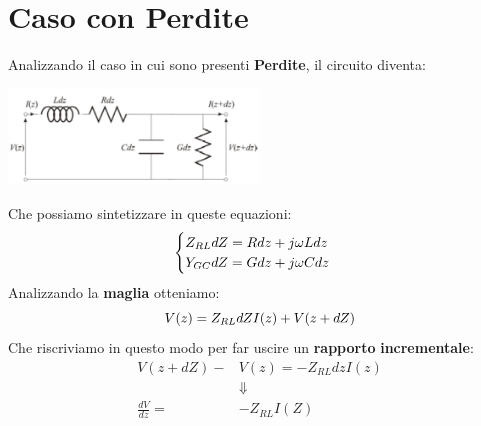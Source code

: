 \section{Caso con Perdite}
Analizzando il caso in cui sono presenti \textbf{Perdite}, il circuito diventa:\\
\begin{center}
    \includegraphics[width=0.5\textwidth]{Images/figure5.png}
\end{center}
Che possiamo sintetizzare in queste equazioni:
\begin{equation*}
    \begin{cases}
    Z_{RL} dZ = R dz + j \omega L dz\\
    Y_{GC} dZ = G dz + j \omega C dz
    \end{cases}
\end{equation*}
Analizzando la \textbf{maglia} otteniamo:
\begin{equation*}
    V(z) = Z_{RL} dZ I(z) + V(z + dZ)\\
\end{equation*}
Che riscriviamo in questo modo per far uscire un \textbf{rapporto} \textbf{incrementale}:
\begin{equation*}
\begin{aligned}
    V(z + dZ) - &V(z) = - Z_{RL} dz I(z)
    \\
    &\Downarrow \\
    \frac{dV}{dz} = &- Z_{RL} I(Z)
\end{aligned} 
\end{equation*}

